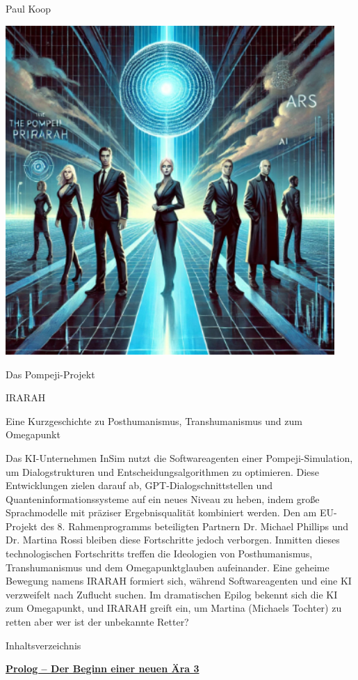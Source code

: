\documentclass[
]{article}
\author{}
\date{}
\begin{document}
Paul Koop

\includegraphics[width=4.92849in,height=4.92031in]{media/image0.png}

Das Pompeji-Projekt

IRARAH

Eine Kurzgeschichte zu Posthumanismus, Transhumanismus und zum
Omegapunkt

Das KI-Unternehmen InSim nutzt die Softwareagenten einer
Pompeji-Simulation, um Dialogstrukturen und Entscheidungsalgorithmen zu
optimieren. Diese Entwicklungen zielen darauf ab,
GPT-Dialogschnittstellen und Quanteninformationssysteme auf ein neues
Niveau zu heben, indem große Sprachmodelle mit präziser Ergebnisqualität
kombiniert werden. Den am EU-Projekt des 8. Rahmenprogramms beteiligten
Partnern Dr. Michael Phillips und Dr. Martina Rossi bleiben diese
Fortschritte jedoch verborgen. Inmitten dieses technologischen
Fortschritts treffen die Ideologien von Posthumanismus, Transhumanismus
und dem Omegapunktglauben aufeinander. Eine geheime Bewegung namens
IRARAH formiert sich, während Softwareagenten und eine KI verzweifelt
nach Zuflucht suchen. Im dramatischen Epilog bekennt sich die KI zum
Omegapunkt, und IRARAH greift ein, um Martina (Michaels Tochter) zu
retten aber wer ist der unbekannte Retter?

Inhaltsverzeichnis

\hyperref[prolog-der-beginn-einer-neuen-uxe4ra]{\textbf{Prolog -- Der
Beginn einer neuen Ära 3}}
\end{document}
